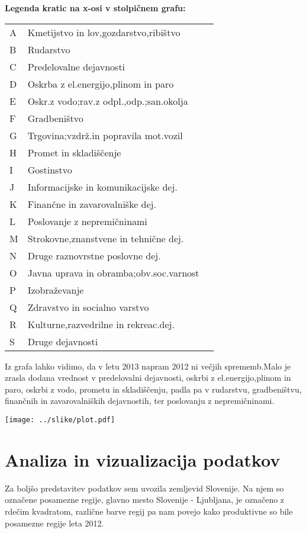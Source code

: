 \documentclass[a4paper, 11pt]{article}
\begin{document}
\textbf{Legenda kratic na x-osi v stolpičnem grafu:}
\begin{table}[h]
\begin{tabular}{lll}
A  & Kmetijstvo in lov,gozdarstvo,ribištvo \\
B & Rudarstvo  \\
C & Predelovalne dejavnosti  \\
D & Oskrba z el.energijo,plinom in paro	\\
E & Oskr.z vodo;rav.z odpl.,odp.;san.okolja	\\
F & Gradbeništvo	\\
G & Trgovina;vzdrž.in popravila mot.vozil	\\
H & Promet in skladiščenje	\\
I & Gostinstvo	\\
J & Informacijske in komunikacijske dej.\\	
K & Finančne in zavarovalniške dej.	\\
L & Poslovanje z nepremičninami	\\
M & Strokovne,znanstvene in tehnične dej.	\\
N & Druge raznovrstne poslovne dej.	\\
O & Javna uprava in obramba;obv.soc.varnost \\
P & Izobraževanje	\\
Q & Zdravstvo in socialno varstvo	\\
R & Kulturne,razvedrilne in rekreac.dej.\\	
S & Druge dejavnosti
\end{tabular}
\end{table}

Iz grafa lahko vidimo, da v letu 2013 napram 2012 ni večjih sprememb.Malo je zrasla dodana vrednost v predelovalni dejavnosti, oskrbi z el.energijo,plinom in paro, oskrbi z vodo, prometu in skladiščenju, padla pa v rudarstvu, gradbeništvu, finančnih in zavarovalniških dejavnostih, ter poslovanju z nepremičninami.\\


\begin{center}

\texttt{[image: ../slike/plot.pdf]}

\end{center}


\section{Analiza in vizualizacija podatkov}
Za boljšo predstavitev podatkov sem uvozila zemljevid Slovenije. Na njem so označene posamezne regije, glavno mesto Slovenije - Ljubljana, je označeno z rdečim kvadratom, različne barve regij pa nam povejo kako produktivne so bile posamezne regije leta 2012.
\end{document}
